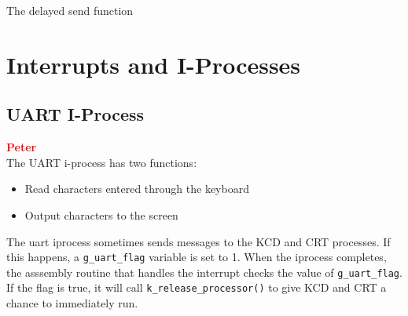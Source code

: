 \documentclass[12pt]{report}
\begin{document}
\begin{algorithm}
  \caption{The delayed send function}
  \begin{algorithmic}[1]
		\EndIf
		\EndIf
    \EndProcedure
  \end{algorithmic}
\end{algorithm}


\section{Interrupts and I-Processes}

\subsection{UART I-Process}

\textcolor{red}{\textbf{Peter}} \\

The UART i-process has two functions:

\begin{itemize}
\item Read characters entered through the keyboard
\item Output characters to the screen
\end{itemize}

The uart iprocess sometimes sends messages to the KCD and CRT processes. If this happens, a {\tt g\_uart\_flag} variable is set to 1. When the iprocess completes, the asssembly routine that handles the interrupt checks the value of {\tt g\_uart\_flag}. If the flag is true, it will call {\tt k\_release\_processor()} to give KCD and CRT a chance to immediately run.\\
\end{document}

